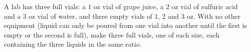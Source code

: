 A lab has three full vials: a $1$ oz vial of grape juice, a $2$ oz vial of sulfuric acid and a $3$ oz vial of water, and three empty vials of $1$, $2$ and $3$ oz. With no other equipment (liquid can only be poured from one vial into another until the first is empty or the second is full), make three full vials, one of each size, each containing the three liquids in the same ratio.
